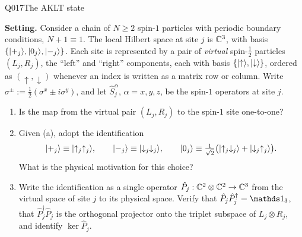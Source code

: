 \begin{entry}{Q017}{The AKLT state}


\begin{problem}
\textbf{Setting.} Consider a chain of $N\ge 2$ spin-$1$ particles with periodic boundary
conditions, $N+1\equiv 1$. The local Hilbert space at site $j$ is $\mathbb{C}^{3}$, with basis
$\{\lvert +_j \rangle,\lvert 0_j \rangle,\lvert -_j \rangle\}$. Each site is represented by a pair of
\emph{virtual} spin-$\tfrac12$ particles $(L_j,R_j)$, the ``left'' and ``right''
components, each with basis $\{\lvert \uparrow \rangle,\lvert \downarrow \rangle\}$, ordered as
$(\uparrow,\downarrow)$ whenever an index is written as a matrix row or column. Write
$\sigma^{\pm}:=\tfrac12(\sigma^{x}\pm i\sigma^{y})$, and let $\hat S_j^{\alpha}$,
$\alpha=x,y,z$, be the spin-$1$ operators at site $j$.

\begin{enumerate}[label=\textbf{(\alph*)},leftmargin=*]
  \item Is the map from the virtual pair $(L_j,R_j)$ to the spin-$1$ site one-to-one?

  \item Given (a), adopt the identification
        \[
          \lvert +_j \rangle\equiv\lvert \uparrow_j\uparrow_j \rangle,
          \qquad
          \lvert -_j \rangle\equiv\lvert \downarrow_j\downarrow_j \rangle,
          \qquad
          \lvert 0_j \rangle\equiv\tfrac{1}{\sqrt2}\bigl(\lvert \uparrow_j\downarrow_j \rangle
            +\lvert \downarrow_j\uparrow_j \rangle\bigr).
        \]
        What is the physical motivation for this choice?

  \item Write the identification as a single operator
        $\hat P_j: \mathbb{C}^{2}\otimes\mathbb{C}^{2} \to \mathbb{C}^{3}$ from the virtual space of site $j$ to
        its physical space. Verify that $\hat P_j\hat P_j^{\dagger}=\id_{3}$, that
        $\hat P_j^{\dagger}\hat P_j$ is the orthogonal projector onto the triplet
        subspace of $L_j\otimes R_j$, and identify $\ker\hat P_j$.


\end{enumerate}
\end{problem}
\end{entry}
